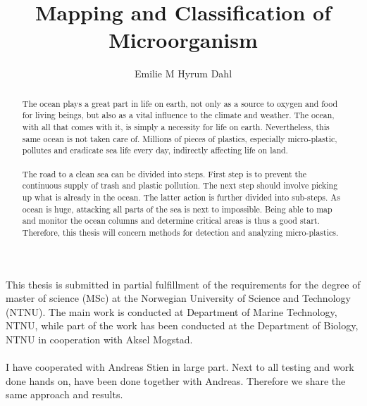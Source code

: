 \documentclass[phd,tocprelim]{thesis}
\title {Mapping and Classification of Microorganism}
\author {Emilie M Hyrum Dahl}
\begin{document}

\maketitle
\makecopyright

\begin{abstract}
The ocean plays a great part in life on earth, not only as a source to oxygen and food for living beings, but also as a vital influence to the climate and weather. The ocean, with all that comes with it, is simply a necessity for life on earth. Nevertheless, this same ocean is not taken care of. Millions of pieces of plastics, especially micro-plastic, pollutes and eradicate sea life every day, indirectly affecting life on land. 
\\\\
The road to a clean sea can be divided into steps. First step is to prevent the continuous supply of trash and plastic pollution. The next step should involve picking up what is already in the ocean. The latter action is further divided into sub-steps. As ocean is huge, attacking all parts of the sea is next to impossible. Being able to map and monitor the ocean columns and determine critical areas is thus a good start. Therefore, this thesis will concern methods for detection and analyzing micro-plastics. 

\end{abstract}

\begin{preface}
This thesis is submitted in partial fulfillment of the requirements for the degree of master of science (MSc) at the Norwegian University of Science and Technology (NTNU). The main work is conducted at Department of Marine Technology, NTNU, while part of the work has been conducted at the Department of Biology, NTNU in cooperation with Aksel Mogstad. 
\\\\
I have cooperated with Andreas Stien in large part. Next to all testing and work done hands on, have been done together with Andreas. Therefore we share the same approach and results. 

\end{preface}
\end{document}
